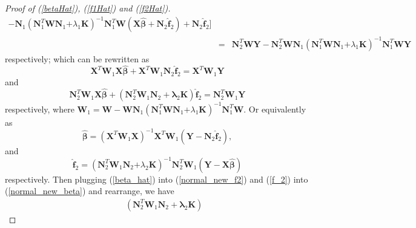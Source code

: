 \documentclass[review]{elsarticle}
\begin{document}
\begin{proof} [Proof of (\ref{betaHat}),  (\ref{f1Hat}) and  (\ref{f2Hat})]
\begin{eqnarray*}
- 
\boldsymbol N_1 
(\boldsymbol N_1^T  \boldsymbol W \boldsymbol N_1 \boldsymbol 
+ \lambda_1 \boldsymbol K)^{-1}
\boldsymbol N_1^T  \boldsymbol W
(\boldsymbol X \boldsymbol {\hat \beta} +  \boldsymbol N_2 \boldsymbol {\hat f}_2)
+  \boldsymbol N_2 \boldsymbol {\hat f}_2
\big] \\
&=&
  \boldsymbol N_2^T  \boldsymbol W
 \boldsymbol Y
  - \boldsymbol N_2^T  \boldsymbol W
  \boldsymbol N_1 
 (\boldsymbol N_1^T  \boldsymbol W \boldsymbol N_1 \boldsymbol 
 + \lambda_1 \boldsymbol K)^{-1}
 \boldsymbol N_1^T  \boldsymbol W \boldsymbol Y
\end{eqnarray*}
respectively; 
which can be rewritten as
\begin{equation} \label{normal_new_beta}
\boldsymbol X^T  \boldsymbol W_1
\boldsymbol X \boldsymbol {\hat \beta} 
+ 
\boldsymbol X^T  \boldsymbol W_1
\boldsymbol N_2 \boldsymbol {\hat f}_2
=
\boldsymbol X^T  \boldsymbol W_1
\boldsymbol Y
\end{equation}
and
\begin{equation} \label{normal_new_f2}
\boldsymbol N_2^T  \boldsymbol W_1
\boldsymbol X \boldsymbol {\hat \beta} 
+ 
(\boldsymbol N_2^T  \boldsymbol W_1
\boldsymbol N_2 + \boldsymbol \lambda_2 \boldsymbol K)
\boldsymbol {\hat f}_2
=
\boldsymbol N_2^T  \boldsymbol W_1
\boldsymbol Y
\end{equation}
respectively,
where 
$\boldsymbol W_1 =
 \boldsymbol W 
 -
\boldsymbol W \boldsymbol N_1 
 (\boldsymbol N_1^T  \boldsymbol W \boldsymbol N_1 \boldsymbol 
 + \lambda_1 \boldsymbol K)^{-1} 
 \boldsymbol N_1^T  \boldsymbol W$.
Or equivalently as 
\begin{equation} \label{beta_hat}
\boldsymbol {\hat \beta} 
= 
(\boldsymbol X^T  \boldsymbol W_1\boldsymbol X)^{-1}  
\boldsymbol X^T  \boldsymbol W_1 (\boldsymbol Y
- \boldsymbol N_2 \boldsymbol {\hat f}_2), 
\end{equation}
and
\begin{equation}   \label{f_2}
\boldsymbol {\hat f}_2 
=  (\boldsymbol N_2^T  \boldsymbol W_1 \boldsymbol N_2 \boldsymbol 
+ \lambda_2 \boldsymbol K)^{-1}
\boldsymbol N_2^T  \boldsymbol W_1 (\boldsymbol Y -\boldsymbol X \boldsymbol {\hat \beta})
\end{equation}
respectively.
Then  plugging (\ref{beta_hat}) into  (\ref{normal_new_f2})
and (\ref{f_2}) into (\ref{normal_new_beta}) and rearrange, we have
\begin{eqnarray*}
&&
(\boldsymbol N_2^T  \boldsymbol W_1
\boldsymbol N_2 + \boldsymbol \lambda_2 \boldsymbol K)

\end{eqnarray*}
\end{proof}
\end{document}
